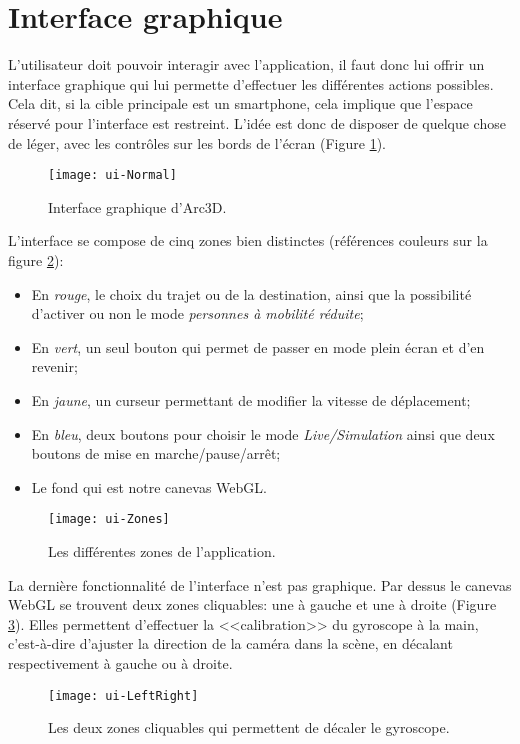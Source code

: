 \section{Interface graphique}
L'utilisateur doit pouvoir interagir avec l'application, il faut donc lui offrir un interface graphique qui lui permette d'effectuer les différentes actions possibles. Cela dit, si la cible principale est un smartphone, cela implique que l'espace réservé pour l'interface est restreint. L'idée est donc de disposer de quelque chose de léger, avec les contrôles sur les bords de l'écran (Figure \ref{fig:ui-normal}).

\begin{figure}[H]
	\centering
	\texttt{[image: ui-Normal]}
	\caption{Interface graphique d'Arc3D.}
	\label{fig:ui-normal}
\end{figure}

L'interface se compose de cinq zones bien distinctes (références couleurs sur la figure \ref{fig:ui-zones}):
\begin{itemize}
	\item En \emph{rouge}, le choix du trajet ou de la destination, ainsi que la possibilité d'activer ou non le mode \textit{personnes à mobilité réduite};
	\item En \emph{vert}, un seul bouton qui permet de passer en mode plein écran et d'en revenir;
	\item En \emph{jaune}, un curseur permettant de modifier la vitesse de déplacement;
	\item En \emph{bleu}, deux boutons pour choisir le mode \textit{Live/Simulation} ainsi que deux boutons de mise en marche/pause/arrêt;
	\item Le fond qui est notre canevas WebGL.
\end{itemize}

\begin{figure}[H]
	\centering
	\texttt{[image: ui-Zones]}
	\caption{Les différentes zones de l'application.}
	\label{fig:ui-zones}
\end{figure}

La dernière fonctionnalité de l'interface n'est pas graphique. Par dessus le canevas WebGL se trouvent deux zones cliquables: une à gauche et une à droite (Figure \ref{fig:ui-leftright}). Elles permettent d'effectuer la <<calibration>> du gyroscope à la main, c'est-à-dire d'ajuster la direction de la caméra dans la scène, en décalant respectivement à gauche ou à droite.

\begin{figure}[H]
	\centering
	\texttt{[image: ui-LeftRight]}
	\caption{Les deux zones cliquables qui permettent de décaler le gyroscope.}
	\label{fig:ui-leftright}
\end{figure}